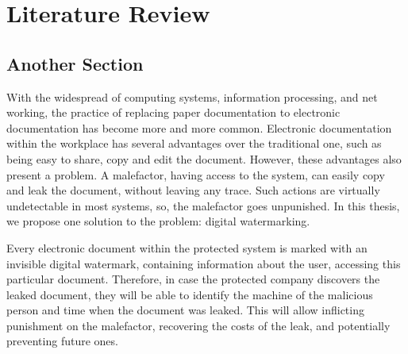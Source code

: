 \chapter{Literature Review}
\label{chap:lr}


\Blindtext[2]

\section{Another Section}
\Blindtext[1]
\newpage
With the widespread of computing systems, information processing, and net working, the practice of replacing paper documentation to electronic documentation has become more and more common. Electronic documentation within the workplace has several advantages over the traditional one, such as being easy to share, copy and edit the document. However, these advantages also present a problem. A malefactor, having access to the system, can easily copy and leak the document, without leaving any trace. Such actions are virtually undetectable in most systems, so, the malefactor goes unpunished. In this thesis, we propose one solution to the problem: digital watermarking.

Every electronic document within the protected system is marked with an invisible digital watermark, containing information about the user, accessing this particular document. Therefore, in case the protected company discovers the leaked document, they will be able to identify the machine of the malicious person and time when the document was leaked. This will allow inflicting punishment on the malefactor, recovering the costs of the leak, and potentially preventing future ones.

